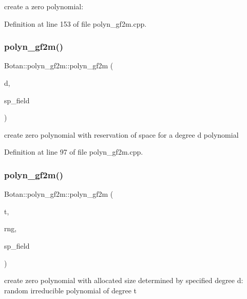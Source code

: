 create a zero polynomial\+: 

Definition at line 153 of file polyn\+\_\+gf2m.\+cpp.

\mbox{\label{class_botan_1_1polyn__gf2m_a689acdaa3af60106fac3c2ccb7edc0b7}} 
\subsubsection{\texorpdfstring{polyn\+\_\+gf2m()}{polyn\_gf2m()}\hspace{0.1cm}{\footnotesize\ttfamily [2/5]}}
{\footnotesize\ttfamily Botan\+::polyn\+\_\+gf2m\+::polyn\+\_\+gf2m (\begin{DoxyParamCaption}\item[{int}]{d,  }\item[{std\+::shared\+\_\+ptr$<$ G\+F2m\+\_\+\+Field $>$}]{sp\+\_\+field }\end{DoxyParamCaption})}

create zero polynomial with reservation of space for a degree d polynomial 

Definition at line 97 of file polyn\+\_\+gf2m.\+cpp.

\mbox{\label{class_botan_1_1polyn__gf2m_a249c5142d1c1ba263f863ed5f92ba319}} 
\subsubsection{\texorpdfstring{polyn\+\_\+gf2m()}{polyn\_gf2m()}\hspace{0.1cm}{\footnotesize\ttfamily [3/5]}}
{\footnotesize\ttfamily Botan\+::polyn\+\_\+gf2m\+::polyn\+\_\+gf2m (\begin{DoxyParamCaption}\item[{int}]{t,  }\item[{Botan\+::\+Random\+Number\+Generator \&}]{rng,  }\item[{std\+::shared\+\_\+ptr$<$ G\+F2m\+\_\+\+Field $>$}]{sp\+\_\+field }\end{DoxyParamCaption})}

create zero polynomial with allocated size determined by specified degree d\+: random irreducible polynomial of degree t 

